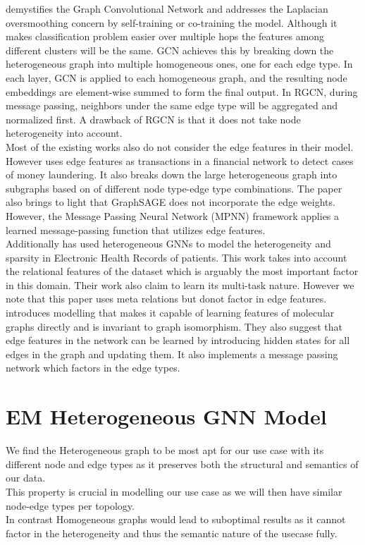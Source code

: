 \documentclass{report} %
\begin{document}
\cite{GCN-2018} demystifies the Graph Convolutional Network and addresses the Laplacian oversmoothing concern by self-training or co-training the model.
Although it makes classification problem easier over multiple hops the features among different clusters will be the same.
GCN achieves this by breaking down the heterogeneous graph into multiple homogeneous ones, one for each edge type. 
In each layer, GCN is applied to each homogeneous graph, and the resulting node embeddings are element-wise summed to form the final output. 
In RGCN, during message passing, neighbors under the same edge type will be aggregated and normalized first. 
A drawback of RGCN is that it does not take node heterogeneity into account. \\
\cite{HGNN-2020}
Most of the existing works also do not consider the edge features in their model. However \cite{ML HGNN-2023} uses edge features as transactions in a financial network to detect cases of money laundering.
It also breaks down the large heterogeneous graph into subgraphs based on  of different node type-edge type combinations. 
The paper also brings to light that GraphSAGE does not incorporate the edge weights.\\
However, the Message Passing Neural Network (MPNN) framework applies a learned message-passing function that utilizes edge features.\\

Additionally \cite{EHR HGNN-2024} has used heterogeneous \ac{GNN}s to model the heterogeneity and sparsity in Electronic Health Records of patients. 
This work takes into account the relational features of the dataset which is arguably the most important factor in this domain. 
Their work also claim to learn its multi-task nature. However we note that this paper uses meta relations but donot factor in edge features.\\

\cite{QC-MP-2017} introduces modelling that makes it capable of learning features of molecular graphs directly and is invariant to graph isomorphism. 
They also suggest that edge features in the network can be learned by introducing hidden states for all edges in the graph and updating them.
It also implements a message passing network which factors in the edge types.\\

\section{\ac{EM} Heterogeneous \ac{GNN} Model}\label{sec:EM Heterogeneous GNN Model}
We find the Heterogeneous graph to be most apt for our use case with its different node and edge types as it preserves both the structural and semantics of our data. \\
This property is crucial in modelling our use case as we will then have similar node-edge types per topology. \\
In contrast Homogeneous graphs would lead to suboptimal results as it cannot factor in the heterogeneity and thus the semantic nature of the usecase fully. \\
\end{document}

